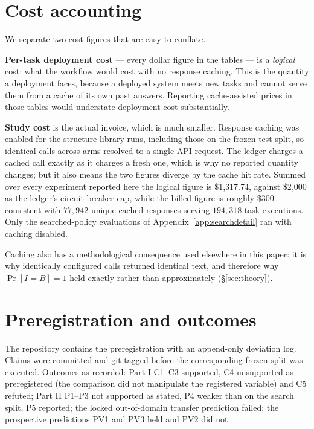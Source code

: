 \documentclass{article}
\begin{document}
\section{Cost accounting}
\label{app:cost}

We separate two cost figures that are easy to conflate.

\textbf{Per-task deployment cost} --- every dollar figure in the tables --- is a
\emph{logical} cost: what the workflow would cost with no response caching. This
is the quantity a deployment faces, because a deployed system meets new tasks and
cannot serve them from a cache of its own past answers. Reporting cache-assisted
prices in those tables would understate deployment cost substantially.

\textbf{Study cost} is the actual invoice, which is much smaller. Response
caching was enabled for the structure-library runs, including those on the
frozen test split, so identical calls across arms resolved to a single API
request. The ledger charges a cached call exactly as it charges a fresh one,
which is why no reported quantity changes; but it also means the two figures
diverge by the cache hit rate. Summed over every experiment reported here the
logical figure is \$1{,}317.74, against \$2{,}000 as the ledger's
circuit-breaker cap, while the billed figure is roughly \$300 --- consistent
with $77{,}942$ unique cached responses serving $194{,}318$ task executions.
Only the searched-policy evaluations of Appendix~\ref{app:searchdetail} ran with
caching disabled.

Caching also has a methodological consequence used elsewhere in this paper: it
is why identically configured calls returned identical text, and therefore why
$\Pr[I{=}B]=1$ held exactly rather than approximately (\S\ref{sec:theory}).

\section{Preregistration and outcomes}
\label{app:prereg}

The repository contains the preregistration with an append-only deviation log.
Claims were committed and git-tagged before the corresponding frozen split was
executed. Outcomes as recorded: Part I C1--C3 supported, C4 unsupported as
preregistered (the comparison did not manipulate the registered variable) and
C5 refuted; Part II
P1--P3 not supported as stated, P4 weaker than on the search split, P5 reported;
the locked out-of-domain transfer prediction failed; the prospective predictions
PV1 and PV3 held and PV2 did not.
\end{document}
